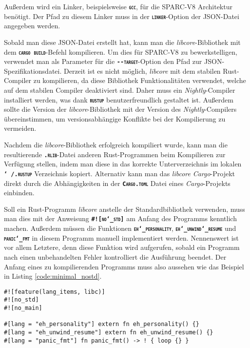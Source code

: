 Außerdem wird ein Linker, beispielsweise \texttt{\textsc{\textbf{gcc}}},
für die SPARC-V8 Architektur benötigt. Der Pfad zu diesem Linker
muss in der \texttt{\textsc{\textbf{linker}}}-Option der JSON-Datei angegeben werden.

Sobald man diese JSON-Datei erstellt hat, kann man die \textit{libcore}-Bibliothek mit dem
\texttt{\textsc{\textbf{cargo build}}}-Befehl kompilieren.
Um dies für SPARC-V8 zu bewerkstelligen, verwendet man als Parameter für die
\texttt{\textsc{\textbf{-{}-target}}}-Option den Pfad zur JSON-Spezifikationsdatei.
Derzeit ist es nicht möglich, \textit{libcore} mit dem stabilen Rust-Compiler zu kompilieren,
da diese Bibliothek Funktionalitäten verwendet, welche auf dem stabilen Compiler deaktiviert sind.
Daher muss ein \textit{Nightly}-Compiler installiert werden, was
dank \texttt{\textsc{\textbf{rustup}}} benutzerfreundlich gestaltet ist.
Außerdem sollte die Version der \textit{libcore}-Bibliothek
mit der Version des \textit{Nightly}-Compilers übereinstimmen,
um versionsabhängige Konflikte bei der Kompilierung zu vermeiden.

Nachdem die \textit{libcore}-Bibliothek erfolgreich kompiliert wurde, kann man
die resultierende \texttt{\textsc{\textbf{.rlib}}}-Datei anderen Rust-Programmen
beim Kompilieren zur Verfügung stellen, indem man diese in das korrekte Unterverzeichnis im
lokalen \texttt{\textsc{\textbf{\char`~/.rustup}}} Verzeichnis kopiert.
Alternativ kann man das \textit{libcore} \textit{Cargo}-Projekt direkt durch die Abhängigkeiten in der
\texttt{\textsc{\textbf{Cargo.toml}}} Datei eines \textit{Cargo}-Projekts einbinden.

Soll ein Rust-Programm \textit{libcore} anstelle der Standardbibliothek verwenden, muss man dies
mit der Anweisung \texttt{\textsc{\textbf{\#![no\char`_std]}}}
am Anfang des Programms kenntlich machen.
Außerdem müssen die Funktionen \texttt{\textsc{\textbf{eh\char`_personality}}},
\texttt{\textsc{\textbf{eh\char`_unwind\char`_resume}}} und
\texttt{\textsc{\textbf{panic\char`_fmt}}} in diesem Programm manuell implementiert werden.
Nennenswert ist vor allem Letztere, denn diese Funktion
wird aufgerufen, sobald ein Programm nach einen unbehandelten Fehler kontrolliert die Ausführung beendet.
Der Anfang eines zu kompilierenden Programms muss also aussehen wie das Beispiel in Listing \ref{code:minimal_nostd}.

\begin{lstlisting}[float,caption={
Der Beginn eines Rust-Programms, welches nicht die Standardbibliothek verwendet.
},label=code:minimal_nostd]
#![feature(lang_items, libc)]
#![no_std]
#![no_main]

#[lang = "eh_personality"] extern fn eh_personality() {}
#[lang = "eh_unwind_resume"] extern fn eh_unwind_resume() {}
#[lang = "panic_fmt"] fn panic_fmt() -> ! { loop {} }
\end{lstlisting}

